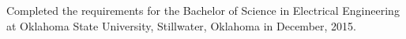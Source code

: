 \begin{vitapage}
\begin{education}
Completed the requirements for the Bachelor of Science in Electrical Engineering at Oklahoma State University, Stillwater, Oklahoma in December, 2015.
\end{education}



\end{vitapage}
